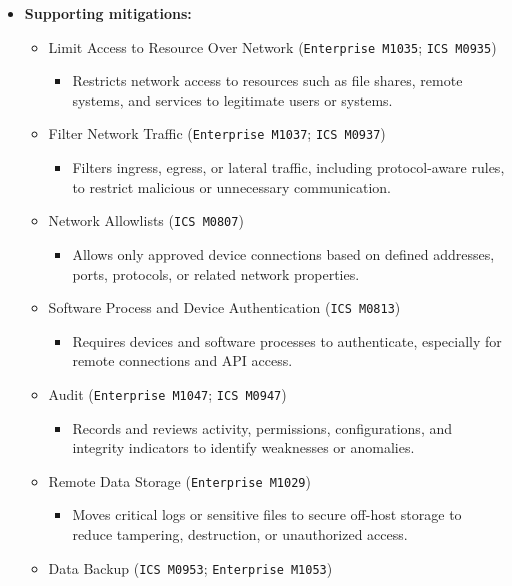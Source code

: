 \documentclass[10pt,a4paper,oneside]{report}
\begin{document}
\begin{itemize}
\item \textbf{Supporting mitigations:}
\begin{itemize}
\item Limit Access to Resource Over Network (\texttt{Enterprise M1035}; \texttt{ICS M0935})
\begin{itemize}
\item Restricts network access to resources such as file shares, remote systems, and services to legitimate users or systems.
\end{itemize}
\item Filter Network Traffic (\texttt{Enterprise M1037}; \texttt{ICS M0937})
\begin{itemize}
\item Filters ingress, egress, or lateral traffic, including protocol-aware rules, to restrict malicious or unnecessary communication.
\end{itemize}
\item Network Allowlists (\texttt{ICS M0807})
\begin{itemize}
\item Allows only approved device connections based on defined addresses, ports, protocols, or related network properties.
\end{itemize}
\item Software Process and Device Authentication (\texttt{ICS M0813})
\begin{itemize}
\item Requires devices and software processes to authenticate, especially for remote connections and API access.
\end{itemize}
\item Audit (\texttt{Enterprise M1047}; \texttt{ICS M0947})
\begin{itemize}
\item Records and reviews activity, permissions, configurations, and integrity indicators to identify weaknesses or anomalies.
\end{itemize}
\item Remote Data Storage (\texttt{Enterprise M1029})
\begin{itemize}
\item Moves critical logs or sensitive files to secure off-host storage to reduce tampering, destruction, or unauthorized access.
\end{itemize}
\item Data Backup (\texttt{ICS M0953}; \texttt{Enterprise M1053})
\begin{itemize}

\end{itemize}
\end{itemize}
\end{itemize}
\end{document}
